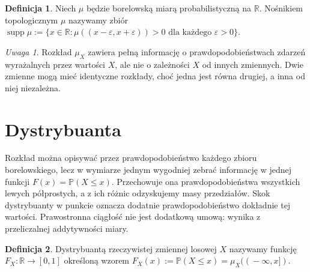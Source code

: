 \documentclass[11pt,a4paper,oneside]{report}
\numberwithin{equation}{chapter}
\theoremstyle{plain}
\theoremstyle{definition}
\newtheorem{definicja}{Definicja}[chapter]
\theoremstyle{remark}
\newtheorem{uwaga}{Uwaga}[chapter]
\newcommand{\R}{\mathbb{R}}
\newcommand{\Prob}{\mathbb{P}}
\newcommand{\supp}{\operatorname{supp}}
\begin{document}
\begin{definicja}
Niech $\mu$ będzie borelowską miarą probabilistyczną na $\R$.
Nośnikiem topologicznym $\mu$ nazywamy zbiór
$\supp\mu:=\{x\in\R:\mu((x-\varepsilon,x+\varepsilon))>0
\text{ dla każdego }\varepsilon>0\}$.
\end{definicja}

\begin{uwaga}
Rozkład $\mu_X$ zawiera pełną informację o prawdopodobieństwach
zdarzeń wyrażalnych przez wartości $X$, ale nie o zależności $X$
od innych zmiennych. Dwie zmienne mogą mieć identyczne rozkłady,
choć jedna jest równa drugiej, a inna od niej niezależna.
\end{uwaga}

\section{Dystrybuanta}
Rozkład można opisywać przez prawdopodobieństwo każdego zbioru
borelowskiego, lecz w wymiarze jednym wygodniej zebrać
informację w jednej funkcji $F(x)=\Prob(X\leq x)$.
Przechowuje ona prawdopodobieństwa wszystkich lewych półprostych,
a z ich różnic odzyskujemy masy przedziałów. Skok dystrybuanty
w punkcie oznacza dodatnie prawdopodobieństwo dokładnie tej wartości.
Prawostronna ciągłość nie jest dodatkową umową: wynika z
przeliczalnej addytywności miary.

\begin{definicja}
Dystrybuantą rzeczywistej zmiennej losowej $X$ nazywamy funkcję
$F_X:\R\to[0,1]$ określoną wzorem
$F_X(x):=\Prob(X\leq x)=\mu_X((\! -\infty,x])$.
\end{definicja}
\end{document}
